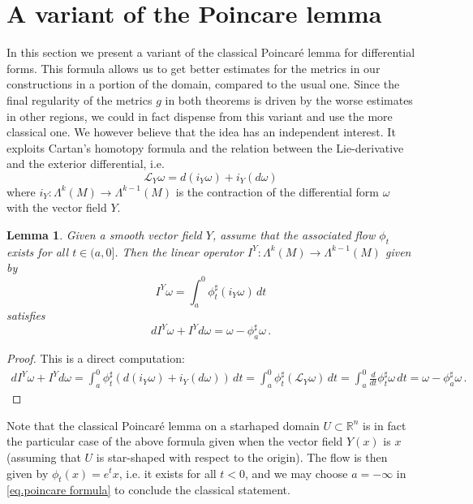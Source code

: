 \documentclass[reqno]{amsart}
\newtheorem{lemma}[theorem]{Lemma}
\theoremstyle{definition}
\theoremstyle{remark}
\numberwithin{equation}{section}
\newcommand{\R}{\mathbb{R}}
\begin{document}
\section{A variant of the Poincare lemma}
In this section we present a variant of the classical Poincar\'e lemma  for differential forms. This formula allows us to get better estimates for the metrics in our constructions in a portion of the domain, compared to the usual one. Since the final regularity of the metrics $g$ in both theorems is driven by the worse estimates in other regions, we could in fact dispense from this variant and use the more classical one. We however believe that the idea has an independent interest. It exploits Cartan's homotopy formula and the relation between the Lie-derivative and the exterior differential, i.e.  
\begin{equation}\label{eq.Lie derivative}
    \mathcal{L}_Y\omega = d\left(i_Y\omega\right)+i_Y(d\omega)
\end{equation}
where $i_Y\colon\Lambda^k(M) \to \Lambda^{k-1}(M)$ is the contraction of the differential form $\omega$ with the vector field $Y$.
\begin{lemma}\label{lem.poincare}
Given a smooth vector field $Y$, assume that the associated flow $\phi_t$ exists for all $t \in (a,0]$. Then the linear operator $I^Y\colon \Lambda^k(M) \to \Lambda^{k-1}(M)$ given by 
\begin{equation}\label{eq.poincare formula}
I^Y\omega = \int_a^0 \phi_t^\sharp (i_Y\omega)\, dt
\end{equation}
satisfies 
\begin{equation}\label{eq.poincare relation}
    dI^Y\omega + I^Yd\omega= \omega- \phi^\sharp_a\omega\,.
\end{equation}
\end{lemma}
\begin{proof}
This is a direct computation: 
\begin{align*}
     dI^Y\omega + I^Yd\omega = \int_a^0 \phi_t^\sharp\left( d\left(i_Y\omega\right)+i_Y(d\omega)\right)\,dt= \int_a^0 \phi_t^\sharp\left( \mathcal{L}_Y\omega\right)\,dt=\int_a^0 \frac{d}{dt} \phi_t^\sharp\omega\,dt= \omega- \phi^\sharp_a\omega\,.
\end{align*}
\end{proof}
Note that the classical Poincar\'e lemma on a starhaped domain $U\subset \R^n$ is in fact the particular case of the above formula given when the vector field $Y(x)$ is $x$ (assuming that $U$ is star-shaped with respect to the origin). The flow is then given by $\phi_t(x)=e^{t}x$,  i.e. it exists for all $t<0$, and we may choose $a=-
\infty$ in \eqref{eq.poincare formula} to conclude the classical statement.



\end{document}
